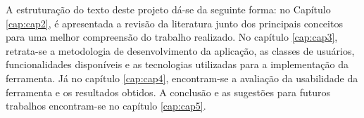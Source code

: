\par
A estruturação do texto deste projeto dá-se da seguinte forma: no Capítulo \ref{cap:cap2}, é apresentada a revisão da literatura junto dos principais conceitos para uma melhor 
compreensão do trabalho realizado. No capítulo \ref{cap:cap3}, retrata-se a metodologia de desenvolvimento da aplicação, as classes de usuários, funcionalidades disponíveis e
as tecnologias utilizadas para a implementação da ferramenta. Já no capítulo \ref{cap:cap4}, encontram-se a avaliação da usabilidade da ferramenta e os resultados obtidos. 
A conclusão e as sugestões para futuros trabalhos encontram-se no capítulo \ref{cap:cap5}.
